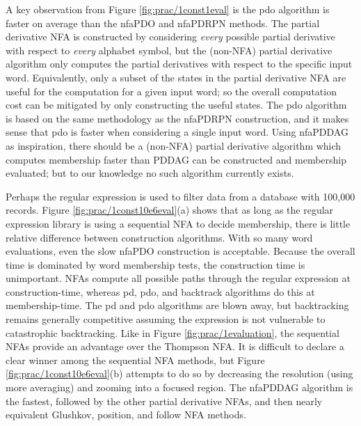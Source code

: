 A key observation from Figure \ref{fig:prac/1const1eval} is the pdo algorithm is faster on average than the nfaPDO and nfaPDRPN methods. The partial derivative NFA is constructed by considering \emph{every} possible partial derivative with respect to \emph{every} alphabet symbol, but the (non-NFA) partial derivative algorithm only computes the partial derivatives with respect to the specific input word. Equivalently, only a subset of the states in the partial derivative NFA are useful for the computation for a given input word; so the overall computation cost can be mitigated by only constructing the useful states. The pdo algorithm is based on the same methodology as the nfaPDRPN construction, and it makes sense that pdo is faster when considering a single input word. Using nfaPDDAG as inspiration, there should be a (non-NFA) partial derivative algorithm which computes membership faster than PDDAG can be constructed and membership evaluated; but to our knowledge no such algorithm currently exists.

Perhaps the regular expression is used to filter data from a database with 100,000 records. Figure \ref{fig:prac/1const10e6eval}(a) shows that as long as the regular expression library is using a sequential NFA to decide membership, there is little relative difference between construction algorithms. With so many word evaluations, even the slow nfaPDO construction is acceptable. Because the overall time is dominated by word membership tests, the construction time is unimportant. NFAs compute all possible paths through the regular expression at construction-time, whereas pd, pdo, and backtrack algorithms do this at membership-time. The pd and pdo algorithms are blown away, but backtracking remains generally competitive assuming the expression is not vulnerable to catastrophic backtracking. Like in Figure \ref{fig:prac/1evaluation}, the sequential NFAs provide an advantage over the Thompson NFA. It is difficult to declare a clear winner among the sequential NFA methods, but Figure \ref{fig:prac/1const10e6eval}(b) attempts to do so by decreasing the resolution (using more averaging) and zooming into a focused region. The nfaPDDAG algorithm is the fastest, followed by the other partial derivative NFAs, and then nearly equivalent Glushkov, position, and follow NFA methods. 

